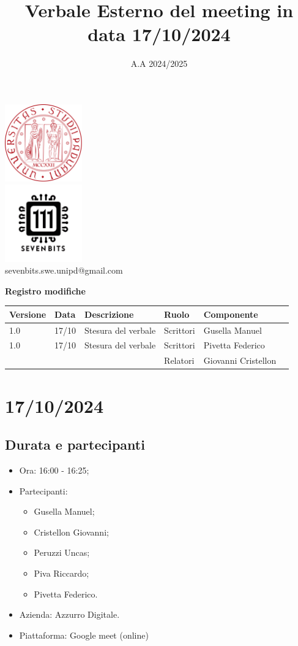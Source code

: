 \documentclass[12pt]{article}
\title{Verbale Esterno del meeting in data 17/10/2024}
\date{A.A 2024/2025}
\begin{document}
\maketitle
\center 
\includegraphics[width=0.25\textwidth]{LogoUnipd}\\
\includegraphics[width=0.25\textwidth]{Sevenbitslogo}\\
sevenbits.swe.unipd@gmail.com\\
\vspace{2mm}

\textbf{Registro modifiche}\\
\vspace{2mm}
\begin{tabular}{|l|l|l|l|l|l|}
\hline
\textbf{Versione} & \textbf{Data} & \textbf{Descrizione} & \textbf{Ruolo} & \textbf{Componente} \\
\hline
1.0 & 17/10 & Stesura del verbale & Scrittori & Gusella Manuel\\
\hline
1.0 & 17/10 & Stesura del verbale & Scrittori & Pivetta Federico\\
\hline
& & & Relatori & Giovanni Cristellon\\
\hline
\end{tabular}

\raggedright
\tableofcontents
\newpage
\section{17/10/2024}
\subsection{Durata e partecipanti}
\begin{itemize}
\item Ora: 16:00 - 16:25;
\item Partecipanti: 	
	\begin{itemize}
	\item Gusella Manuel;
	\item Cristellon Giovanni;
	\item Peruzzi Uncas;
	\item Piva Riccardo;
	\item Pivetta Federico.
	\end{itemize}
\item Azienda: Azzurro Digitale.
\item Piattaforma: Google meet (online)
\end{itemize}
\end{document}
